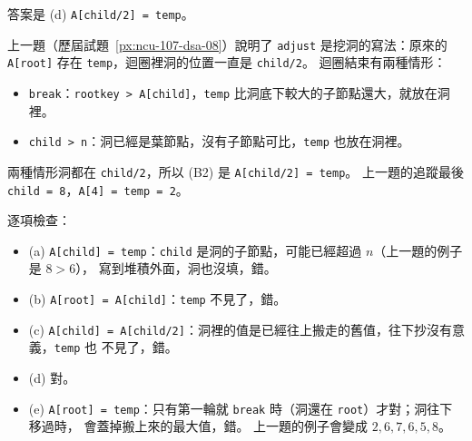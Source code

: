\begin{pastsoln}
答案是 (d) \texttt{A[child/2] = temp}。

上一題（歷屆試題~\ref{px:ncu-107-dsa-08}）說明了 \texttt{adjust} 是挖洞的寫法：原來的
\texttt{A[root]} 存在 \texttt{temp}，迴圈裡洞的位置一直是 \texttt{child/2}。 迴圈結束有兩種情形：
\begin{itemize}
\item \texttt{break}：\texttt{rootkey > A[child]}，\texttt{temp} 比洞底下較大的子節點還大，就放在洞裡。
\item \texttt{child > n}：洞已經是葉節點，沒有子節點可比，\texttt{temp} 也放在洞裡。
\end{itemize}
兩種情形洞都在 \texttt{child/2}，所以 (B2) 是 \texttt{A[child/2] = temp}。 上一題的追蹤最後
\texttt{child = 8}，\texttt{A[4] = temp = 2}。

逐項檢查：
\begin{itemize}
\item (a) \texttt{A[child] = temp}：\texttt{child} 是洞的子節點，可能已經超過 $n$（上一題的例子是 $8 > 6$），
寫到堆積外面，洞也沒填，錯。
\item (b) \texttt{A[root] = A[child]}：\texttt{temp} 不見了，錯。
\item (c) \texttt{A[child] = A[child/2]}：洞裡的值是已經往上搬走的舊值，往下抄沒有意義，\texttt{temp} 也
不見了，錯。
\item (d) 對。
\item (e) \texttt{A[root] = temp}：只有第一輪就 \texttt{break} 時（洞還在 \texttt{root}）才對；洞往下移過時，
會蓋掉搬上來的最大值，錯。 上一題的例子會變成 $2, 6, 7, 6, 5, 8$。
\end{itemize}
\end{pastsoln}
